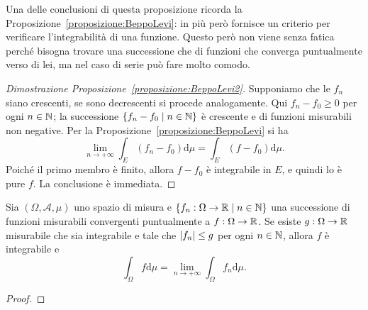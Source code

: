 Una delle conclusioni di questa proposizione ricorda la Proposizione~\ref{proposizione:BeppoLevi}: in più però fornisce un criterio per verificare l'integrabilità di una funzione. Questo però non viene senza fatica perché bisogna trovare una successione che di funzioni che converga puntualmente verso di lei, ma nel caso di serie può fare molto comodo.

\begin{proof}[Dimostrazione Proposizione~\ref{proposizione:BeppoLevi2}]
Supponiamo che le \(f_n\) siano crescenti, se sono decrescenti si procede analogamente. Qui \(f_n - f_0 \ge 0\) per ogni \(n \in \mathbb N\); la successione \(\left\{f_n-f_0 \mid n \in \mathbb N\right\}\) è crescente e di funzioni misurabili non negative. Per la Proposizione~\ref{proposizione:BeppoLevi} si ha 
\[\lim_{n \to + \infty} \int_E (f_n-f_0) \mathrm d \mu = \int_E (f-f_0) \mathrm d \mu .\]
Poiché il primo membro è finito, allora \(f-f_0\) è integrabile in \(E\), e quindi lo è pure \(f\). La conclusione è immediata. 
\end{proof}

\begin{lemma}
\end{lemma}

\begin{proposizione}
Sia \((\Omega, \mathcal A, \mu)\) uno spazio di misura e \(\left\{f_n : \Omega \to \mathbb R \mid n \in \mathbb N\right\}\) una successione di funzioni misurabili convergenti puntualmente a \(f : \Omega \to \mathbb R\). Se esiste \(g : \Omega \to \mathbb R\) misurabile che sia integrabile e tale che \(\left\lvert f_n\right\rvert \le g\) per ogni \(n \in \mathbb N\), allora \(f\) è integrabile e
\[\int_\Omega f \mathrm d \mu = \lim_{n \to +\infty} \int_\Omega f_n \mathrm d \mu .\]
\end{proposizione}

\begin{proof}
\end{proof}
